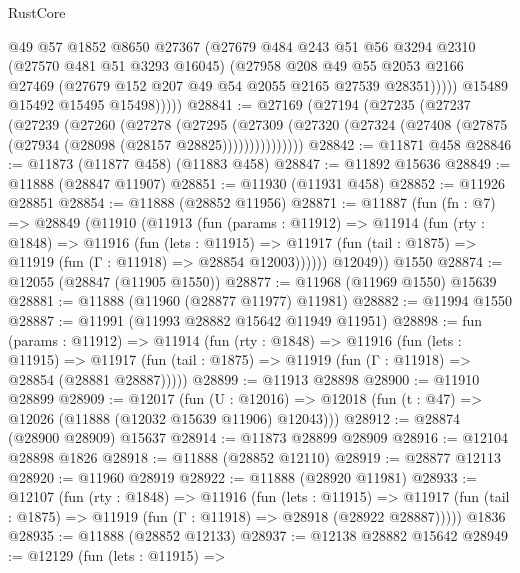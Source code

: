 \begin{lexlean}{RustCore}
\begin{coremodule}
                  @49
                  @57
                  @1852
                  @8650
                  @27367
                  (@27679
                    @484
                    @243
                    @51
                    @56
                    @3294
                    @2310
                    (@27570 @481 @51 @3293 @16045)
                    (@27958
                      @208
                      @49
                      @55
                      @2053
                      @2166
                      @27469
                      (@27679 @152 @207 @49 @54 @2055 @2165 @27539 @28351)))))
              @15489
              @15492
              @15495
              @15498)))))
@28841 := @27169
    (@27194
      (@27235
        (@27237
          (@27239
            (@27260
              (@27278
                (@27295
                  (@27309
                    (@27320 (@27324 (@27408 (@27875 (@27934 (@28098 (@28157 @28825)))))))))))))))
@28842 := @11871 @458
@28846 := @11873 (@11877 @458) (@11883 @458)
@28847 := @11892 @15636
@28849 := @11888 (@28847 @11907)
@28851 := @11930 (@11931 @458)
@28852 := @11926 @28851
@28854 := @11888 (@28852 @11956)
@28871 := @11887
    (fun (fn : @7) =>
    @28849
      (@11910
        (@11913
          (fun (params : @11912) =>
          @11914
            (fun (rty : @1848) =>
            @11916
              (fun (lets : @11915) =>
              @11917 (fun (tail : @1875) => @11919 (fun (Γ : @11918) => @28854 @12003))))))
        @12049))
    @1550
@28874 := @12055 (@28847 (@11905 @1550))
@28877 := @11968 (@11969 @1550) @15639
@28881 := @11888 (@11960 (@28877 @11977) @11981)
@28882 := @11994 @1550
@28887 := @11991 (@11993 @28882 @15642 @11949 @11951)
@28898 := fun (params : @11912) =>
  @11914
    (fun (rty : @1848) =>
    @11916
      (fun (lets : @11915) =>
      @11917 (fun (tail : @1875) => @11919 (fun (Γ : @11918) => @28854 (@28881 @28887)))))
@28899 := @11913 @28898
@28900 := @11910 @28899
@28909 := @12017
    (fun (U : @12016) => @12018 (fun (t : @47) => @12026 (@11888 (@12032 @15639 @11906) @12043)))
@28912 := @28874 (@28900 @28909) @15637
@28914 := @11873 @28899 @28909
@28916 := @12104 @28898 @1826
@28918 := @11888 (@28852 @12110)
@28919 := @28877 @12113
@28920 := @11960 @28919
@28922 := @11888 (@28920 @11981)
@28933 := @12107
    (fun (rty : @1848) =>
    @11916
      (fun (lets : @11915) =>
      @11917 (fun (tail : @1875) => @11919 (fun (Γ : @11918) => @28918 (@28922 @28887)))))
    @1836
@28935 := @11888 (@28852 @12133)
@28937 := @12138 @28882 @15642
@28949 := @12129
    (fun (lets : @11915) =>

\end{coremodule}
\end{lexlean}
